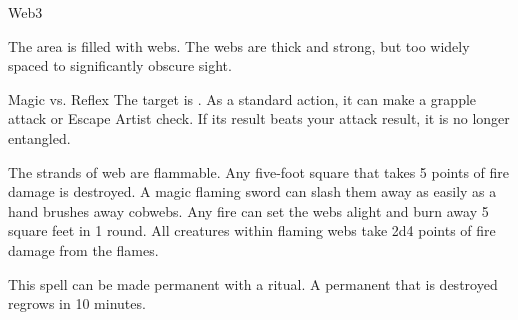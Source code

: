 \begin{spellsection}{Web}{3}
\begin{spellheader}
\end{spellheader}
\begin{spellcontent}
    \begin{spelltargetinginfo}
    \end{spelltargetinginfo}
    \begin{spelleffects}
        \spelleffect The area is filled with webs. The webs are thick and strong, but too widely spaced to significantly obscure sight. %
        \spelldur \durshort \dismissable
    \end{spelleffects}
\end{spellcontent}
\begin{spellsubcontent}
    \begin{spelltargetinginfo}
    \end{spelltargetinginfo}
    \begin{spelleffects}
        \begin{spellattack}{Magic vs. Reflex}
            \spellsuccess The target is \entangled. As a standard action, it can make a grapple attack or Escape Artist check. If its result beats your attack result, it is no longer entangled.
        \end{spellattack}
    \end{spelleffects}
\end{spellsubcontent}
\begin{spellfooter}
    \spellnotes The strands of web are flammable. Any five-foot square that takes 5 points of fire damage is destroyed. A magic flaming sword can slash them away as easily as a hand brushes away cobwebs. Any fire can set the webs alight and burn away 5 square feet in 1 round. All creatures within flaming webs take 2d4 points of fire damage from the flames.

    \physicalspellnotes

    This spell can be made permanent with a  ritual. A permanent  that is destroyed regrows in 10 minutes.
\end{spellfooter}
\end{spellsection}

